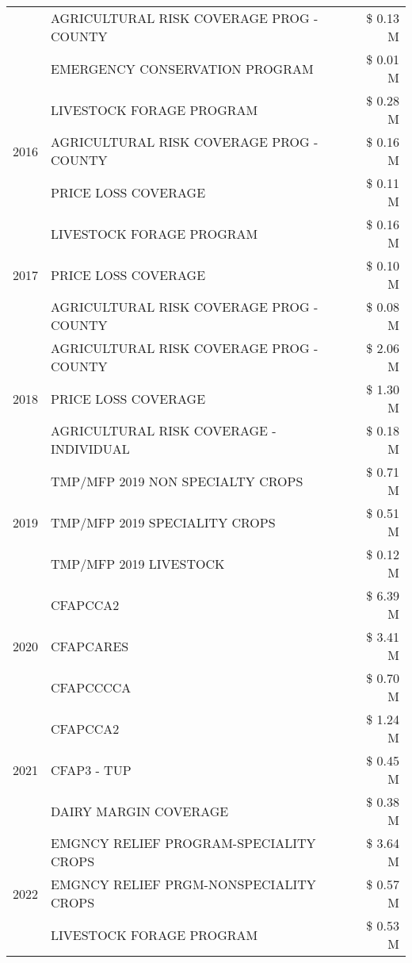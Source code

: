 \begin{tabular}{llr}
 & AGRICULTURAL RISK COVERAGE PROG - COUNTY & \$ 0.13 M \\
 & EMERGENCY CONSERVATION PROGRAM & \$ 0.01 M \\
\cline{1-3}
\multirow[t]{3}{*}{2016} & LIVESTOCK FORAGE PROGRAM & \$ 0.28 M \\
 & AGRICULTURAL RISK COVERAGE PROG - COUNTY & \$ 0.16 M \\
 & PRICE LOSS COVERAGE & \$ 0.11 M \\
\cline{1-3}
\multirow[t]{3}{*}{2017} & LIVESTOCK FORAGE PROGRAM & \$ 0.16 M \\
 & PRICE LOSS COVERAGE & \$ 0.10 M \\
 & AGRICULTURAL RISK COVERAGE PROG - COUNTY & \$ 0.08 M \\
\cline{1-3}
\multirow[t]{3}{*}{2018} & AGRICULTURAL RISK COVERAGE PROG - COUNTY & \$ 2.06 M \\
 & PRICE LOSS COVERAGE & \$ 1.30 M \\
 & AGRICULTURAL RISK COVERAGE - INDIVIDUAL & \$ 0.18 M \\
\cline{1-3}
\multirow[t]{3}{*}{2019} & TMP/MFP 2019 NON SPECIALTY CROPS & \$ 0.71 M \\
 & TMP/MFP 2019 SPECIALITY CROPS & \$ 0.51 M \\
 & TMP/MFP 2019 LIVESTOCK & \$ 0.12 M \\
\cline{1-3}
\multirow[t]{3}{*}{2020} & CFAPCCA2 & \$ 6.39 M \\
 & CFAPCARES & \$ 3.41 M \\
 & CFAPCCCCA & \$ 0.70 M \\
\cline{1-3}
\multirow[t]{3}{*}{2021} & CFAPCCA2 & \$ 1.24 M \\
 & CFAP3 - TUP & \$ 0.45 M \\
 & DAIRY MARGIN COVERAGE & \$ 0.38 M \\
\cline{1-3}
\multirow[t]{3}{*}{2022} & EMGNCY RELIEF PROGRAM-SPECIALITY CROPS & \$ 3.64 M \\
 & EMGNCY RELIEF PRGM-NONSPECIALITY CROPS & \$ 0.57 M \\
 & LIVESTOCK FORAGE PROGRAM & \$ 0.53 M \\
\cline{1-3}
\bottomrule
\end{tabular}

